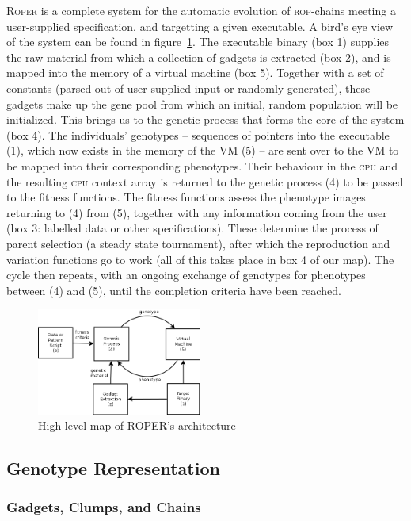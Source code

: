 \textsc{Roper} is a complete system for the automatic evolution
of \textsc{rop}-chains meeting a user-supplied specification, and
targetting a given executable. A bird's eye view of the system
can be found in figure~\ref{fig:architecture}. The executable
binary (box 1) supplies the raw material from which a collection
of gadgets is extracted (box 2), and is mapped into the memory
of a virtual machine (box 5). Together with a set of constants
(parsed out of user-supplied input or randomly generated), these
gadgets make up the gene pool from which an initial, random
population will be initialized. This brings us to the genetic
process that forms the core of the system (box 4). The
individuals' genotypes -- sequences of pointers into the
executable (1), which now exists in the memory of the VM (5) --
are sent over to the VM to be mapped into their corresponding
phenotypes. Their behaviour in the \textsc{cpu} and the
resulting \textsc{cpu} context array is returned to the
genetic process (4) to be passed to the fitness functions.  The
fitness functions assess the phenotype images returning to (4)
from (5), together with any information coming from the user (box 3:
labelled data or other specifications). These determine the
process of parent selection (a steady state tournament), after which the
reproduction and variation functions go to work (all of this
takes place in box 4 of our map). The cycle then repeats, with an
ongoing exchange of genotypes for phenotypes between (4) and (5),
until the completion criteria have been reached. 

\begin{figure}
  \includegraphics[width=\columnwidth,height=3.5cm]{architecture.png}
  \caption{High-level map of ROPER's architecture}
  \label{fig:architecture}
\end{figure}

\subsection{Genotype Representation}


\subsubsection{Gadgets, Clumps, and Chains}

